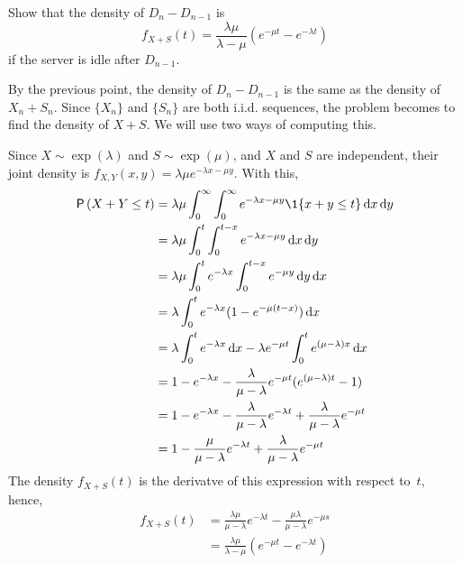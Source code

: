 \begin{exercise}
Show that the density of $D_{n} - D_{n-1}$ is
    \begin{equation*}
    f_{X+S}(t) = \frac{\lambda \mu}{\lambda - \mu} (e^{-\mu t} - e^{-\lambda t})
    \end{equation*}
if the server is idle after $D_{n-1}$.
    \begin{solution}
      By the previous point, the density of $D_{n} - D_{n-1}$ is the
      same as the density of $X_n + S_n$.  Since $\{X_n\}$ and $\{S_n\}$ are both i.i.d. sequences, the problem becomes to find the density of $X+S$.  We will use two ways of computing this. 

\newpage
Since $X\sim \exp(\lambda)$ and $S\sim\exp(\mu)$, and $X$ and $S$ are independent, their joint density is $f_{X,Y}(x,y) = \lambda \mu e^{-\lambda x - \mu y}$. With this,
  \begin{align*}
\P{X+Y\leq t } 
&= \lambda \mu \int_0^\infty \int_0^\infty e^{-\lambda x - \mu y} \1{x+y\leq t} \d x \d y \\
&= \lambda \mu \int_0^t \int_0^{t-x} e^{-\lambda x - \mu y} \d x \d y \\
&= \lambda \mu \int_0^t e^{-\lambda x} \int_0^{t-x} e^{- \mu y} \d y \d x \\
&= \lambda \int_0^t e^{-\lambda x} (1-e^{- \mu (t-x)} ) \d x  \\
&= \lambda \int_0^t e^{-\lambda x}  \d x - \lambda e^{-\mu t} \int_0^t e^{(\mu-\lambda) x} \d x \\
&= 1- e^{-\lambda x} - \frac{\lambda}{\mu-\lambda} e^{-\mu t} ( e^{(\mu-\lambda) t} -1) \\
&= 1- e^{-\lambda x} - \frac{\lambda}{\mu-\lambda} e^{-\lambda t} + \frac{\lambda}{\mu-\lambda} e^{-\mu t} \\ 
&= 1 - \frac{\mu}{\mu-\lambda} e^{-\lambda t} + \frac{\lambda}{\mu-\lambda} e^{-\mu t} \\
  \end{align*}
The density $f_{X+S}(t)$ is the derivatve of this expression with respect to~$t$, hence,
\begin{align*}
  f_{X+S}(t) 
&= \frac{\lambda\mu}{\mu-\lambda} e^{-\lambda t}  - \frac{\mu \lambda}{\mu-\lambda} e^{-\mu s} \\
&= \frac{\lambda\mu}{\lambda -\mu}(e^{-\mu t} - e^{-\lambda t}) \\
\end{align*}


\end{solution}
\end{exercise}
